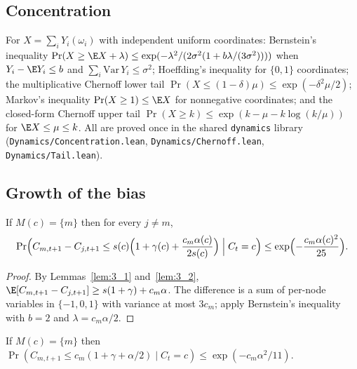 \subsection{Concentration}

\begin{lemma}\label{lem:tails}
  \leanok
  For $X = \sum_i Y_i(\omega_i)$ with independent uniform coordinates:
  Bernstein's inequality
  $\Pr(X \ge \E X + \lambda) \le \exp(-\lambda^2/(2\sigma^2(1 + b\lambda/(3\sigma^2))))$
  when $Y_i - \E Y_i \le b$ and $\sum_i \mathrm{Var}\,Y_i \le \sigma^2$;
  Hoeffding's inequality for $\{0,1\}$ coordinates; the multiplicative
  Chernoff lower tail $\Pr(X \le (1-\delta)\mu) \le \exp(-\delta^2\mu/2)$;
  Markov's inequality $\Pr(X \ge 1) \le \E X$ for nonnegative coordinates;
  and the closed-form Chernoff upper tail
  $\Pr(X \ge k) \le \exp(k - \mu - k\log(k/\mu))$ for $\E X \le \mu \le k$.
  All are proved once in the shared \texttt{dynamics} library
  (\texttt{Dynamics/Concentration.lean}, \texttt{Dynamics/Chernoff.lean},
  \texttt{Dynamics/Tail.lean}).
\end{lemma}

\subsection{Growth of the bias}

\begin{lemma}\label{lem:3_3}
  \leanok
  If $M(c) = \{m\}$ then for every $j \ne m$,
  \[
    \Pr\Bigl(C_{m,t+1} - C_{j,t+1} \le s(c)\Bigl(1 + \gamma(c)
      + \frac{c_m\alpha(c)}{2s(c)}\Bigr) \Bigm| C_t = c\Bigr)
      \le \exp\Bigl(-\frac{c_m\alpha(c)^2}{25}\Bigr).
  \]
\end{lemma}

\begin{proof}
  By Lemmas~\ref{lem:3_1} and~\ref{lem:3_2},
  $\E[C_{m,t+1} - C_{j,t+1}] \ge s(1+\gamma) + c_m\alpha$. The difference is
  a sum of per-node variables in $\{-1,0,1\}$ with variance at most $3c_m$;
  apply Bernstein's inequality with $b = 2$ and $\lambda = c_m\alpha/2$.
\end{proof}

\begin{lemma}[Lemma 3.4]\label{lem:3_4}
  \leanok
  If $M(c) = \{m\}$ then
  $\Pr(C_{m,t+1} \le c_m(1 + \gamma + \alpha/2) \mid C_t = c)
  \le \exp(-c_m\alpha^2/11)$.
\end{lemma}

